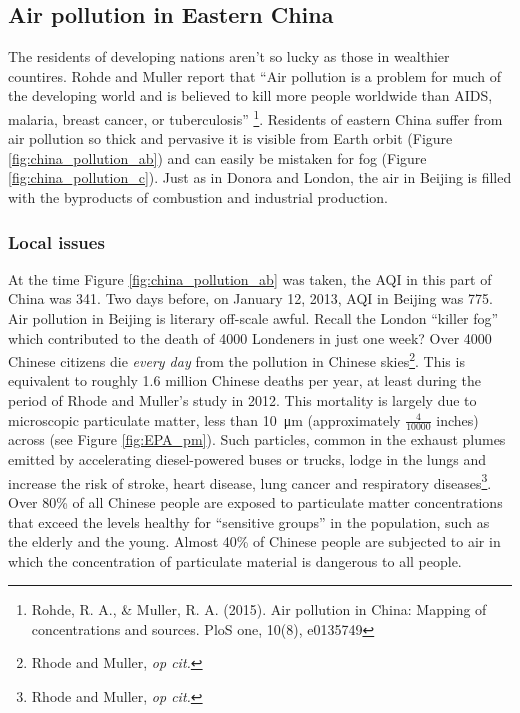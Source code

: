\documentclass[amstex,12pt]{book}
\begin{document}
\subsection{Air pollution in Eastern China}
The residents of developing nations aren't so lucky as those in wealthier countires. Rohde and Muller report that ``Air pollution is a problem for much of the developing world and is believed to kill more
people worldwide than AIDS, malaria, breast cancer, or tuberculosis'' \footnote{Rohde, R. A., \& Muller, R. A. (2015). Air pollution in China: Mapping of concentrations and sources. PloS one, 10(8), e0135749}. Residents of eastern China suffer from air pollution so thick and pervasive it is visible from Earth orbit (Figure \ref{fig:china_pollution_ab}) and can easily be mistaken for fog (Figure \ref{fig:china_pollution_c}). Just as in Donora and London, the air in Beijing is filled with the byproducts of combustion and industrial production.

\subsubsection{Local issues}
At the time Figure \ref{fig:china_pollution_ab} was taken, the AQI in this part of China was 341. Two days before, on January 12, 2013, AQI in Beijing was 775.  Air pollution in Beijing is literary off-scale awful. Recall the London ``killer fog'' which contributed to the death of 4000 Londeners in just one week? Over 4000 Chinese citizens die \emph{every day} from the pollution in Chinese skies\footnote{Rhode and Muller, \textit{op cit.}}. This is equivalent to roughly 1.6 million Chinese deaths per year, at least during the period of Rhode and Muller's study in 2012. This mortality is largely due to microscopic particulate matter, less than \SI{10}{\micro\meter} (approximately $\frac{4}{10000}$ inches) across (see Figure \ref{fig:EPA_pm}). Such particles, common in the exhaust plumes emitted by accelerating diesel-powered buses or trucks, lodge in the lungs and increase the risk of stroke, heart disease, lung cancer and respiratory diseases\footnote{Rhode and Muller, \textit{op cit.}}. Over 80\% of all Chinese people are exposed to particulate matter concentrations that exceed the levels healthy for ``sensitive groups'' in the population, such as the elderly and the young. Almost 40\% of Chinese people are subjected to air in which the concentration of particulate material is dangerous to all people.   
\end{document}
